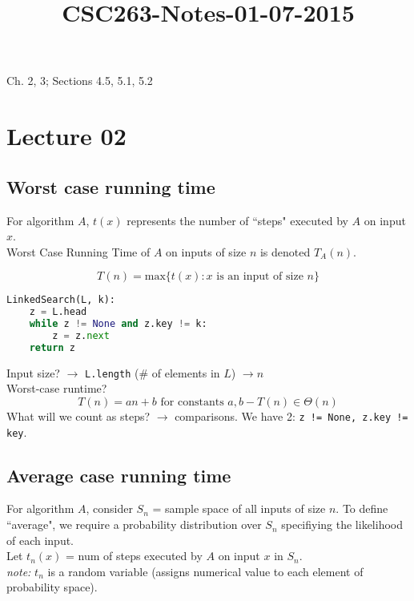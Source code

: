 



\title{CSC263-Notes-01-07-2015}



\reversemarginpar
\mpreadings

\noindent Ch. 2, 3; Sections 4.5, 5.1, 5.2 

\section*{Lecture 02}

\subsection*{Worst case running time}

\noindent For algorithm $A$, $t(x)$ represents the number of ``steps" executed by $A$ on input $x$. \\

\noindent Worst Case Running Time of $A$ on inputs of size $n$ is denoted $T_A(n)$. 

$$T(n) = \textrm{max}\{t(x): x \textrm{ is an input of size }n\}$$ 

\begin{lstlisting}[language=Python,belowskip=\baselineskip]
LinkedSearch(L, k):
	z = L.head
	while z != None and z.key != k:
		z = z.next
	return z
\end{lstlisting} 

\noindent Input size? $\rightarrow$ \texttt{L.length} (\# of elements in $L$) $\rightarrow n$ \\
Worst-case runtime?
$$T(n) = an + b \textrm{ for constants }a,b - T(n) \in \Theta(n)$$
What will we count as steps? $\rightarrow$ comparisons. We have 2: \texttt{z != None, z.key != key}.
\subsection*{Average case running time}

\noindent For algorithm $A$, consider $S_n$ = sample space of all inputs of size $n$. To define ``average", we
	require a probability distribution over $S_n$ specifiying the likelihood of each input. \\

\noindent Let $t_n(x)$ = num of steps executed by $A$ on input $x$ in $S_n$. \\
\indent \textit{note:} $t_n$ is a random variable (assigns numerical value to each element of probability space). \\

